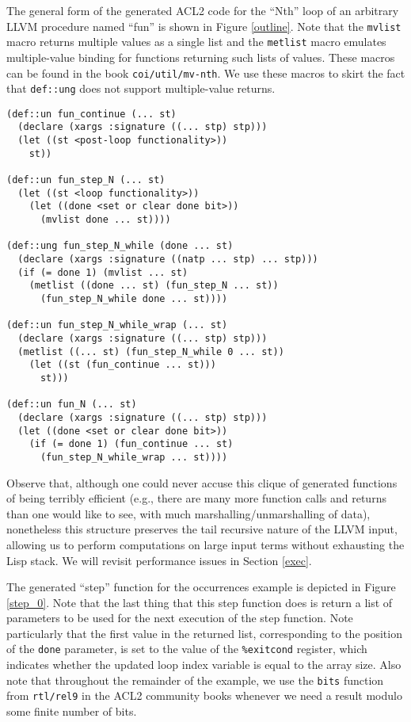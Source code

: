 \documentclass{eptcs}
\begin{document}
The general form of the generated ACL2 code for the ``Nth'' loop
of an arbitrary LLVM procedure named ``fun'' is shown in 
Figure \ref{outline}.  Note that the \texttt{mvlist} macro returns 
multiple values as a single list and the \texttt{metlist} macro
emulates multiple-value binding for functions returning such lists of
values.  These macros can be found in the book
\texttt{coi/util/mv-nth}.  We use these macros to
skirt the fact that \texttt{def::ung} does not support multiple-value
returns.

\begin{figure*}
\begin{verbatim}
(def::un fun_continue (... st)
  (declare (xargs :signature ((... stp) stp)))
  (let ((st <post-loop functionality>))
    st))

(def::un fun_step_N (... st)
  (let ((st <loop functionality>))
    (let ((done <set or clear done bit>))
      (mvlist done ... st))))

(def::ung fun_step_N_while (done ... st)
  (declare (xargs :signature ((natp ... stp) ... stp)))
  (if (= done 1) (mvlist ... st)
    (metlist ((done ... st) (fun_step_N ... st))
      (fun_step_N_while done ... st))))

(def::un fun_step_N_while_wrap (... st)
  (declare (xargs :signature ((... stp) stp)))
  (metlist ((... st) (fun_step_N_while 0 ... st))
    (let ((st (fun_continue ... st)))
      st)))

(def::un fun_N (... st)
  (declare (xargs :signature ((... stp) stp)))
  (let ((done <set or clear done bit>))
    (if (= done 1) (fun_continue ... st)
      (fun_step_N_while_wrap ... st))))
\end{verbatim}
\hrulefill
\caption{Outline of the generated ACL2 code for an LLVM loop.}
\label{outline}
\end{figure*}

Observe that, although one could never accuse this clique of 
generated functions of being terribly efficient (e.g., there are 
many more function calls and returns than one would like to see, 
with much marshalling/unmarshalling of data), nonetheless this 
structure preserves the tail recursive nature of the LLVM input, 
allowing us to perform computations on large 
input terms without exhausting the Lisp stack.  We will revisit 
performance issues in Section \ref{exec}.

The generated ``step'' function for the occurrences example 
is depicted in Figure \ref{step_0}.  Note that the last thing that
this step function does is return a list of parameters to be used
for the next execution of the step function.  Note particularly that
the first value in the returned list, corresponding to the position of
the \texttt{done} parameter, is set to the value of the
\texttt{\%exitcond} register, which indicates whether the updated
loop index variable is equal to the array size.  Also note that
throughout the remainder of the example, we
use the \texttt{bits} function from \texttt{rtl/rel9} in the ACL2 
community books whenever we need a result modulo some finite number of
bits.
\end{document}
